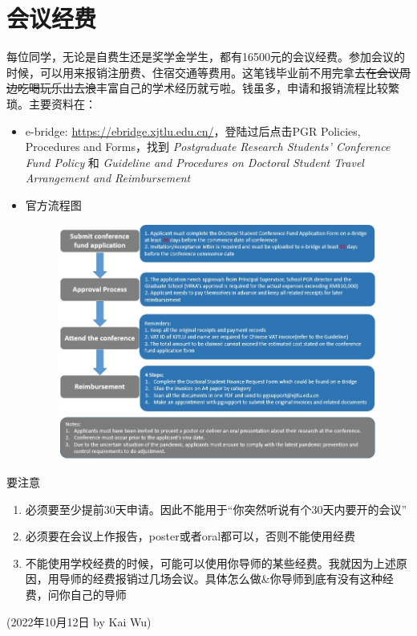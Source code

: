 \section{会议经费}
\label{sec.fund}

每位同学，无论是自费生还是奖学金学生，都有16500元的会议经费。参加会议的时候，可以用来报销注册费、住宿交通等费用。这笔钱毕业前不用完拿去\sout{在会议周边吃喝玩乐出去浪}丰富自己的学术经历就亏啦。钱虽多，申请和报销流程比较繁琐。主要资料在：
\begin{itemize}
    \item e-bridge: \url{https://ebridge.xjtlu.edu.cn/}，登陆过后点击PGR Policies, Procedures and Forms，找到 \textit{Postgraduate Research Students' Conference Fund Policy} 和 \textit{
    Guideline and Procedures on Doctoral Student Travel Arrangement and Reimbursement}
    \item 官方流程图
    \begin{figure}[H]
        \centering
        \includegraphics[width=0.9\columnwidth]{author-folder/Kai.Wu/fund-flowchart.jpg}
    \end{figure}
\end{itemize}

要注意
\begin{enumerate}
    \item 必须要至少提前30天申请。因此不能用于“你突然听说有个30天内要开的会议”
    \item 必须要在会议上作报告，poster或者oral都可以，否则不能使用经费
    \item 不能使用学校经费的时候，可能可以使用你导师的某些经费。我就因为上述原因，用导师的经费报销过几场会议。具体怎么做\&你导师到底有没有这种经费，问你自己的导师
\end{enumerate}


\begin{flushright}
(2022年10月12日 by Kai Wu)
\end{flushright}